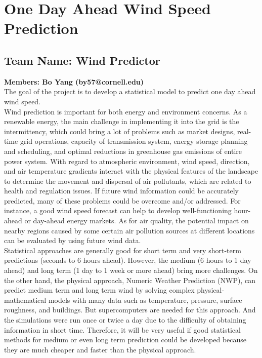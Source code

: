\documentclass{article}
\begin{document}
\section*{One Day Ahead Wind Speed Prediction}
\subsection*{Team Name: Wind Predictor} 
{\bf Members: Bo Yang (by57@cornell.edu)}\\

The goal of the project is to develop a statistical model to predict one day ahead wind speed.\\

Wind prediction is important for both energy and environment concerns. As a renewable energy, the main challenge in implementing it into the grid is the intermittency, which could bring a lot of problems such as market designs, real-time grid operations, capacity of transmission system, energy storage planning and scheduling, and optimal reductions in greenhouse gas emissions of entire power system.  With regard to atmospheric environment, wind speed, direction, and air temperature gradients interact with the physical features of the landscape to determine the movement and dispersal of air pollutants, which are related to health and regulation issues.  If future wind information could be accurately predicted, many of these problems could be overcome and/or addressed. For instance, a good wind speed forecast can help to develop well-functioning hour-ahead or day-ahead energy markets. As for air quality, the potential impact on nearby regions caused by some certain air pollution sources at different locations can be evaluated by using future wind data.\\

Statistical approaches are generally good for short term and very short-term predictions (seconds to 6 hours ahead).  However, the medium (6 hours to 1 day ahead) and long term (1 day to 1 week or more ahead) bring more challenges.  On the other hand, the physical approach, Numeric Weather Prediction (NWP), can predict medium term and long term wind by solving complex physical-mathematical models with many data such as temperature, pressure, surface roughness, and buildings.  But supercomputers are needed for this approach.  And the simulations were run once or twice a day due to the difficulty of obtaining information in short time.  Therefore, it will be very useful if good statistical methods for medium or even long term prediction could be developed because they are much cheaper and faster than the physical approach.\\
\end{document}
